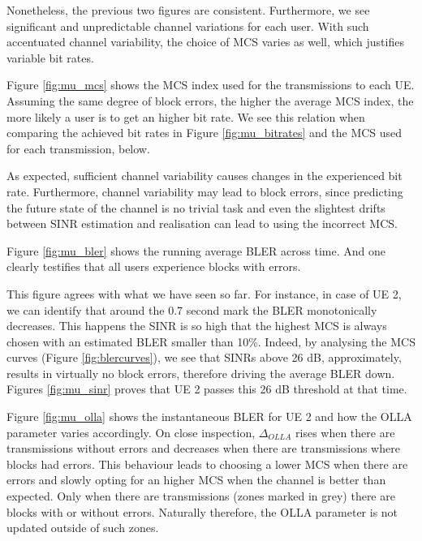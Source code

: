 Nonetheless, the previous two figures are consistent. Furthermore, we see significant and unpredictable channel variations for each user. With such accentuated channel variability, the choice of MCS varies as well, which justifies variable bit rates.

Figure \ref{fig:mu_mcs} shows the \ac{MCS} index used for the transmissions to each \acs{UE}. Assuming the same degree of block errors, the higher the average MCS index, the more likely a user is to get an higher bit rate. We see this relation when comparing the achieved bit rates in Figure \ref{fig:mu_bitrates} and the MCS used for each transmission, below.

As expected, sufficient channel variability causes changes in the experienced bit rate. Furthermore, channel variability may lead to block errors, since predicting the future state of the channel is no trivial task and even the slightest drifts between SINR estimation and realisation can lead to using the incorrect MCS.

Figure \ref{fig:mu_bler} shows the running average BLER across time. And one clearly testifies that all users experience blocks with errors.

This figure agrees with what we have seen so far. For instance, in case of \ac{UE} 2, we can identify that around the 0.7 second mark the BLER monotonically decreases. This happens the SINR is so high that the highest MCS is always chosen with an estimated BLER smaller than 10\%. Indeed, by analysing the \acs{MCS} curves (Figure \ref{fig:blercurves}), we see that \acsp{SINR} above 26 dB, approximately, results in virtually no block errors, therefore driving the average BLER down. Figures \ref{fig:mu_sinr} proves that UE 2 passes this 26 dB threshold at that time.



Figure \ref{fig:mu_olla} shows the instantaneous \acs{BLER} for UE 2 and how the OLLA parameter varies accordingly. On close inspection, $\Delta_{OLLA}$ rises when there are transmissions without errors and decreases when there are transmissions where blocks had errors. This behaviour leads to choosing a lower MCS when there are errors and slowly opting for an higher MCS when the channel is better than expected. Only when there are transmissions (zones marked in grey) there are blocks with or without errors. Naturally therefore, the \acs{OLLA} parameter is not updated outside of such zones.

